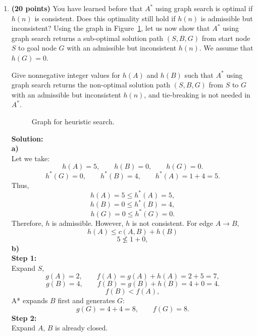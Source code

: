 \documentclass[11pt]{article}
\begin{document}
\begin{enumerate}[label=\textbf{\arabic*.}, leftmargin=*]
    \newpage

    \item \textbf{(20 points)} You have learned before that $A^*$ using graph search is optimal if $h(n)$ is consistent. Does this optimality still hold if $h(n)$ is admissible but inconsistent? Using the graph in Figure~\ref{fig:heuristic-search}, let us now show that $A^*$ using graph search returns a sub-optimal solution path $(S,B,G)$ from start node $S$ to goal node $G$ with an admissible but inconsistent $h(n)$. We assume that $h(G) = 0$.

    Give nonnegative integer values for $h(A)$ and $h(B)$ such that $A^*$ using graph search returns the non-optimal solution path $(S,B,G)$ from $S$ to $G$ with an admissible but inconsistent $h(n)$, and tie-breaking is not needed in $A^*$.

    \begin{figure}[h]
        \centering
        \caption{Graph for heuristic search.}
        \label{fig:heuristic-search}
    \end{figure}
    \textbf{Solution:}\\
\textbf{a)}\\
Let we take:
\[
h(A)=5,\qquad h(B)=0,\qquad h(G)=0.
\]
\[
h^*(G)=0,\qquad h^*(B)=4,\qquad h^*(A)=1+4=5.
\]
Thus,
\[
h(A)=5\le h^*(A)=5,
\]
\[
h(B)=0\le h^*(B)=4,
\]
\[
h(G)=0\le h^*(G)=0.
\]
Therefore, \(h\) is admissible.
However, \(h\) is not consistent. For edge \(A\to B\),
\[
h(A)\le c(A,B)+h(B)
\]
\[
5\nleq 1+0,
\]
\textbf{b)}\\
\textbf{Step 1:}\\
Expand \(S\),
\[
g(A)=2,\qquad f(A)=g(A)+h(A)=2+5=7,
\]
\[
g(B)=4,\qquad f(B)=g(B)+h(B)=4+0=4.
\]
\[
f(B)<f(A),
\]
A* expands \(B\) first and generates \(G\):
\[
g(G)=4+4=8,\qquad f(G)=8.
\]
\textbf{Step 2:}\\
Expand \(A\), $B$ is already closed.


\end{enumerate}
\end{document}

